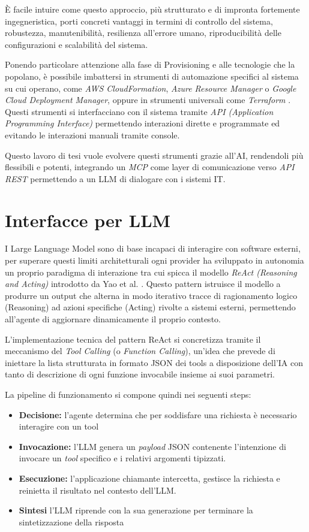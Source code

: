 È facile intuire come questo approccio, più strutturato e di impronta fortemente ingegneristica, porti concreti vantaggi in termini di controllo del sistema, robustezza, manutenibilità, resilienza all'errore umano, riproducibilità delle configurazioni e scalabilità del sistema.

Ponendo particolare attenzione alla fase di Provisioning e alle tecnologie che la popolano, è possibile imbattersi in strumenti di automazione specifici al sistema su cui operano, come \textit{AWS CloudFormation}, \textit{Azure Resource Manager} o \textit{Google Cloud Deployment Manager}, oppure in strumenti universali come \textit{Terraform} \cite{Terraform}. Questi strumenti si interfacciano con il sistema tramite \textit{API (Application Programming Interface)} permettendo interazioni dirette e programmate ed evitando le interazioni manuali tramite console.

Questo lavoro di tesi vuole evolvere questi strumenti grazie all'AI, rendendoli più flessibili e potenti, integrando un \textit{MCP} come layer di comunicazione verso \textit{API REST} permettendo a un LLM di dialogare con i sistemi IT.

\section{Interfacce per LLM}
I Large Language Model sono di base incapaci di interagire con software esterni, per superare questi limiti architetturali ogni provider ha sviluppato in autonomia un proprio paradigma di interazione tra cui spicca il modello \textit{ReAct (Reasoning and Acting)} introdotto da Yao et al. \cite{yao2023react}.
Questo pattern istruisce il modello a produrre un output che alterna in modo iterativo tracce di ragionamento logico (Reasoning) ad azioni specifiche (Acting) rivolte a sistemi esterni, permettendo all'agente di aggiornare dinamicamente il proprio contesto.

L'implementazione tecnica del pattern ReAct si concretizza tramite il meccanismo del \textit{Tool Calling} (o \textit{Function Calling}), un'idea che prevede di iniettare la lista strutturata in formato JSON dei tools a disposizione dell'IA con tanto di descrizione di ogni funzione invocabile insieme ai suoi parametri.

La pipeline di funzionamento si compone quindi nei seguenti steps:
\begin{itemize}
    \item \textbf{Decisione:} l'agente determina che per soddisfare una richiesta è necessario interagire con un tool
    \item \textbf{Invocazione:} l'LLM genera un \textit{payload} JSON contenente l'intenzione di invocare un \textit{tool} specifico e i relativi argomenti tipizzati.
    \item \textbf{Esecuzione:} l'applicazione chiamante intercetta, gestisce la richiesta e reinietta il risultato nel contesto dell'LLM.
    \item \textbf{Sintesi} l'LLM riprende con la sua generazione per terminare la sintetizzazione della risposta
\end{itemize}

